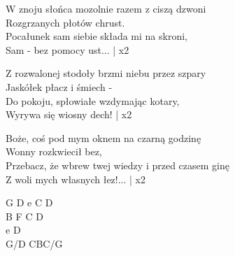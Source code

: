 \begin{text}
    W znoju słońca mozolnie razem z ciszą dzwoni\\
    Rozgrzanych płotów chrust.\\
    Pocałunek sam siebie składa mi na skroni,\\
    Sam - bez pomocy ust... | x2

    Z rozwalonej stodoły brzmi niebu przez szpary\\
    Jaskółek płacz i śmiech -\\
    Do pokoju, spłowiałe wzdymając kotary,\\
    Wyrywa się wiosny dech! | x2

    Boże, coś pod mym oknem na czarną godzinę\\
    Wonny rozkwiecił bez,\\
    Przebacz, że wbrew twej wiedzy i przed czasem ginę\\
    Z woli mych własnych łez!... | x2
\end{text}
\begin{chord}
    G D e C D\\
    B F C D\\
    e D\\
    G/D CBC/G
\end{chord}